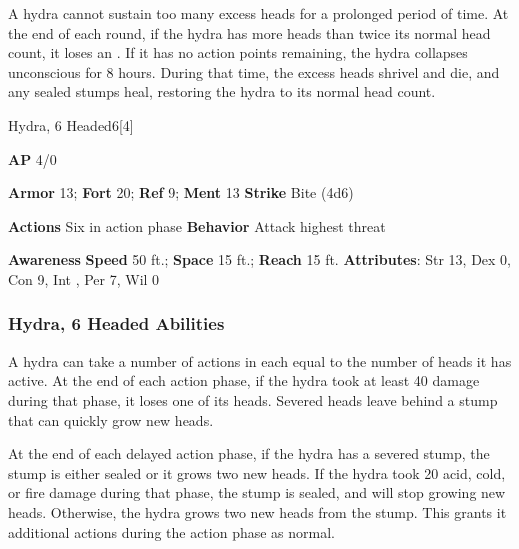 A hydra cannot sustain too many excess heads for a prolonged period of time.
At the end of each round, if the hydra has more heads than twice its normal head count, it loses an .
If it has no action points remaining, the hydra collapses unconscious for 8 hours.
During that time, the excess heads shrivel and die, and any sealed stumps heal, restoring the hydra to its normal head count.

\begin{monsection}{Hydra, 6 Headed}{6}[4]
\vspace{-1em}\vspace{-1em}
\begin{spellcontent}
\begin{spelltargetinginfo}
{\textbf{AP} 4/0}

\pari \textbf{Armor} 13;
\textbf{Fort} 20;
\textbf{Ref} 9;
\textbf{Ment} 13
\pari \textbf{Strike} Bite  (4d6)


\pari \textbf{Actions} Six in action phase
\pari \textbf{Behavior} Attack highest threat
\end{spelltargetinginfo}
\end{spellcontent}

\begin{monsterfooter}
\pari \textbf{Awareness} 
\pari \textbf{Speed} 50 ft.;
\textbf{Space} 15 ft.;
\textbf{Reach} 15 ft.
\pari \textbf{Attributes}:
Str 13,
Dex 0,
Con 9,
Int ,
Per 7,
Wil 0
\end{monsterfooter}
\end{monsection}


\subsubsection{Hydra, 6 Headed Abilities}

A hydra can take a number of actions in each  equal to the number of heads it has active.
At the end of each action phase, if the hydra took at least 40 damage during that phase, it loses one of its heads.
Severed heads leave behind a stump that can quickly grow new heads.

At the end of each delayed action phase, if the hydra has a severed stump, the stump is either sealed or it grows two new heads.
If the hydra took 20 acid, cold, or fire damage during that phase, the stump is sealed, and will stop growing new heads.
Otherwise, the hydra grows two new heads from the stump.
This grants it additional actions during the action phase as normal.

